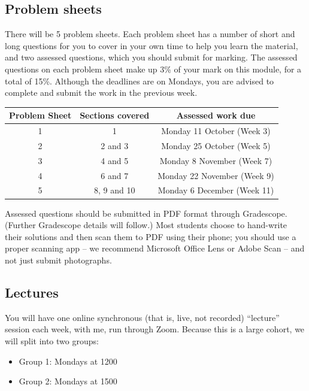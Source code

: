 \documentclass[
  a4paper,
]{book}
\providecommand{\tightlist}{%
  \setlength{\itemsep}{0pt}\setlength{\parskip}{0pt}}
\theoremstyle{definition}
\theoremstyle{definition}
\theoremstyle{definition}
\theoremstyle{definition}
\theoremstyle{remark}
\begin{document}
\hypertarget{problem-sheets}{%
\subsection*{Problem sheets}\label{problem-sheets}}

There will be 5 problem sheets. Each problem sheet has a number of short and long questions for you to cover in your own time to help you learn the material, and two assessed questions, which you should submit for marking. The assessed questions on each problem sheet make up 3\% of your mark on this module, for a total of 15\%. Although the deadlines are on Mondays, you are advised to complete and submit the work in the previous week.

\begin{longtable}[]{@{}ccc@{}}
\toprule
Problem Sheet & Sections covered & Assessed work due \\
\midrule
\endhead
1 & 1 & Monday 11 October (Week 3) \\
2 & 2 and 3 & Monday 25 October (Week 5) \\
3 & 4 and 5 & Monday 8 November (Week 7) \\
4 & 6 and 7 & Monday 22 November (Week 9) \\
5 & 8, 9 and 10 & Monday 6 December (Week 11) \\
\bottomrule
\end{longtable}

Assessed questions should be submitted in PDF format through Gradescope. (Further Gradescope details will follow.) Most students choose to hand-write their solutions and then scan them to PDF using their phone; you should use a proper scanning app -- we recommend Microsoft Office Lens or Adobe Scan -- and not just submit photographs.

\hypertarget{lectures}{%
\subsection*{Lectures}\label{lectures}}

You will have one online synchronous (that is, live, not recorded) ``lecture'' session each week, with me, run through Zoom. Because this is a large cohort, we will split into two groups:

\begin{itemize}
\tightlist
\item
  Group 1: Mondays at 1200
\item
  Group 2: Mondays at 1500
\end{itemize}
\end{document}
